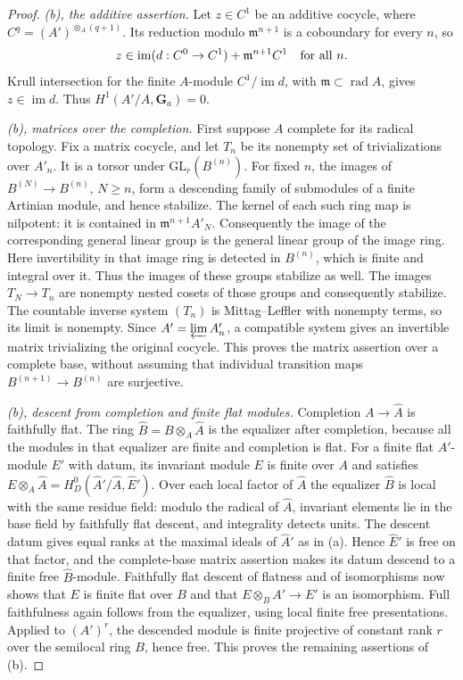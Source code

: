 \begin{proof}
\emph{(b), the additive assertion.}
Let $z\in C^1$ be an additive cocycle, where $C^q=(A')^{\otimes_A(q+1)}$.
Its reduction modulo $\mathfrak m^{n+1}$ is a coboundary for every $n$,
so
\[
 z\in\operatorname{im}(d:C^0\to C^1)+\mathfrak m^{n+1}C^1
       \quad\hbox{for all }n.
\]
Krull intersection for the finite $A$-module
$C^1/\operatorname{im}d$, with $\mathfrak m\subset\operatorname{rad}A$,
gives $z\in\operatorname{im}d$.  Thus $H^1(A'/A,\mathbf G_a)=0$.

\emph{(b), matrices over the completion.}
First suppose $A$ complete for its radical topology.  Fix a matrix
cocycle, and let $T_n$ be its nonempty set of trivializations over $A'_n$.
It is a torsor under $\mathrm{GL}_r(B^{(n)})$.
For fixed $n$, the images of $B^{(N)}\to B^{(n)}$, $N\geq n$, form a
descending family of submodules of a finite Artinian module, and hence
stabilize.  The kernel of each such ring map is nilpotent: it is
contained in $\mathfrak m^{n+1}A'_N$.
Consequently the image of the corresponding general linear group is
the general linear group of the image ring.  Here invertibility in that
image ring is detected in $B^{(n)}$, which is finite and integral over it.
Thus the images of these groups stabilize as well.  The images
$T_N\to T_n$ are nonempty nested cosets of those groups and consequently
stabilize.  The countable inverse system $(T_n)$ is Mittag--Leffler with
nonempty terms, so its limit is nonempty.  Since
$A'=\varprojlim A'_n$, a compatible system gives an invertible matrix
trivializing the original cocycle.  This proves the matrix assertion
over a complete base, without assuming that individual transition maps
$B^{(n+1)}\to B^{(n)}$ are surjective.

\emph{(b), descent from completion and finite flat modules.}
Completion $A\to\widehat A$ is faithfully flat.  The ring
$\widehat B=B\otimes_A\widehat A$ is the equalizer after completion,
because all the modules in that equalizer are finite and completion is
flat.  For a finite flat $A'$-module $E'$ with datum, its invariant
module $E$ is finite over $A$ and satisfies
$E\otimes_A\widehat A=H^0_D(\widehat A'/\widehat A,\widehat E')$.
Over each local factor of $\widehat A$ the equalizer $\widehat B$ is
local with the same residue field: modulo the radical of $\widehat A$,
invariant elements lie in the base field by faithfully flat descent,
and integrality detects units.  The descent datum gives equal ranks at
the maximal ideals of $\widehat A'$ as in (a).  Hence $\widehat E'$ is
free on that factor, and the complete-base matrix assertion makes its
datum descend to a finite free $\widehat B$-module.
Faithfully flat descent of flatness and of isomorphisms now shows that
$E$ is finite flat over $B$ and that $E\otimes_B A'\to E'$ is an
isomorphism.  Full faithfulness again follows from the equalizer,
using local finite free presentations.  Applied to $(A')^r$, the
descended module is finite projective of constant rank $r$ over the
semilocal ring $B$, hence free.  This proves the remaining assertions
of (b).


\end{proof}
